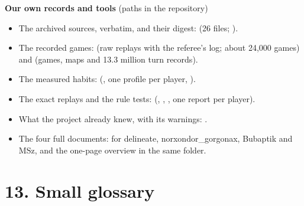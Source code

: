 \documentclass[10pt,a4paper]{article}
\begin{document}
\textbf{Our own records and tools} (paths in the repository)
\begin{itemize}
\item The archived sources, verbatim, and their digest:  (26 files; ).
\item The recorded games:  (raw replays with the referee's log; about 24,000 games) and  (games, maps and 13.3 million turn records).
\item The measured habits:  (, one profile per player, ).
\item The exact replays and the rule tests:  (, , , one report per player).
\item What the project already knew, with its warnings: .
\item The four full documents:  for delineate, norxondor\_gorgonax, Bubaptik and MSz, and the one-page overview  in the same folder.
\end{itemize}

\section*{13. Small glossary}
\end{document}
